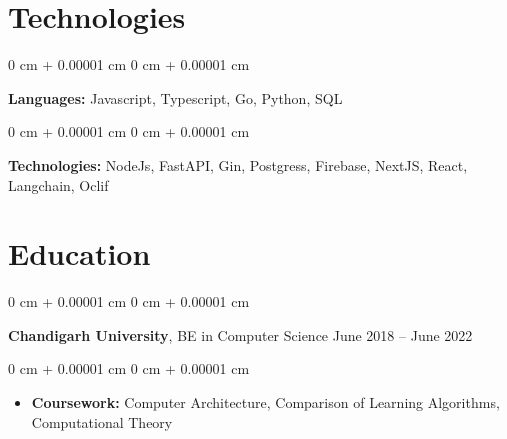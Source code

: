 \documentclass[10pt, letterpaper]{article}
\newenvironment{highlights}{
    \begin{itemize}[
        topsep=0.10 cm,
        parsep=0.10 cm,
        partopsep=0pt,
        itemsep=0pt,
        leftmargin=0 cm + 10pt
    ]
}{
    \end{itemize}
} %
\newenvironment{onecolentry}{
    \begin{adjustwidth}{
        0 cm + 0.00001 cm
    }{
        0 cm + 0.00001 cm
    }
}{
    \end{adjustwidth}
} %
\newenvironment{twocolentry}[2][]{
    \onecolentry
    \def\secondColumn{#2}
    \setcolumnwidth{\fill, 4.5 cm}
    \begin{paracol}{2}
}{
    \switchcolumn \raggedleft \secondColumn
    \end{paracol}
    \endonecolentry
} %
\begin{document}
    
    \section{Technologies}



        
        \begin{onecolentry}
            \textbf{Languages:} Javascript, Typescript, Go, Python, SQL
        \end{onecolentry}

        \vspace{0.2 cm}

        \begin{onecolentry}
            \textbf{Technologies:} NodeJs, FastAPI, Gin, Postgress, Firebase, NextJS, React, Langchain, Oclif 
        \end{onecolentry}

    
    \section{Education}

        
        \begin{twocolentry}{
            June 2018 – June 2022
        }
            \textbf{Chandigarh University}, BE in Computer Science\end{twocolentry}

        \vspace{0.10 cm}
        \begin{onecolentry}
            \begin{highlights}
                \item \textbf{Coursework:} Computer Architecture, Comparison of Learning Algorithms, Computational Theory
            \end{highlights}
        \end{onecolentry}



    
\end{document}
